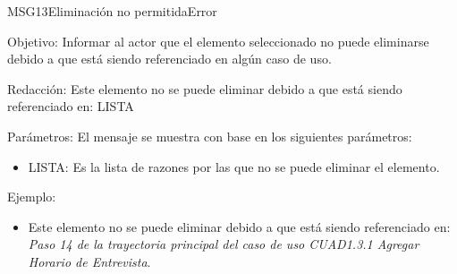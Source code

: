 \begin{mensaje}{MSG13}{Eliminación no permitida}{Error}
	\item [Objetivo:] Informar al actor que el elemento seleccionado no puede eliminarse debido a que está siendo referenciado en algún caso de uso.
	\item[Redacción:] Este elemento no se puede eliminar debido a que está siendo referenciado en: LISTA
	\item[Parámetros:] El mensaje se muestra con base en los siguientes parámetros:
	\begin{itemize}
		\item LISTA: Es la lista de razones por las que no se puede eliminar el elemento.
	\end{itemize}
	\item[Ejemplo:] \begin{itemize}
		\item Este elemento no se puede eliminar debido a que está siendo referenciado en: {\em Paso 14 de la trayectoria principal del caso de uso CUAD1.3.1 Agregar Horario de Entrevista}.
	\end{itemize}
\end{mensaje}